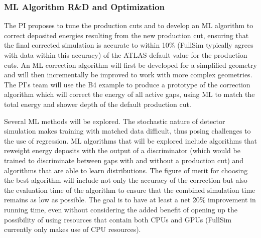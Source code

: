 \documentclass[letter, USenglish, 11pt, subfigure]{article}
\begin{document}

\subsubsection{ML Algorithm R\&D and Optimization}
The PI proposes to tune the production cuts and to develop an ML algorithm to correct deposited energies resulting from the new production cut, ensuring that the final corrected simulation is accurate to within 10\% (FullSim typically agrees with data within this accuracy) of the ATLAS default value for the production cuts. An ML correction algorithm will first be developed for a simplified geometry and will then incrementally be improved to work with more complex geometries. The PI's team will use the B4 example to produce a prototype of the correction algorithm which will correct the energy of all active gaps, using ML to match the total energy and shower depth of the default production cut. 

Several ML methods will be explored. The stochastic nature of detector simulation makes training with matched data difficult, thus posing challenges to the use of regression. ML algorithms that will be explored include algorithms that reweight energy deposits with the output of a discriminator (which would be trained to discriminate between gaps with and without a production cut) and algorithms that are able to learn distributions. The figure of merit for choosing the best algorithm will include not only the accuracy of the correction but also the evaluation time of the algorithm to ensure that the combined simulation time remains as low as possible. The goal is to have at least a net 20\% improvement in running time, even without considering the added benefit of opening up the possibility of using resources that contain both CPUs and GPUs (FullSim currently only makes use of CPU resources).
\end{document}
